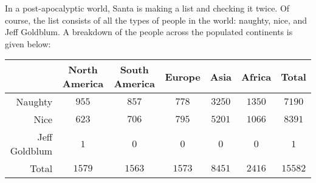 \documentclass[12pt,letterpaper]{exam}
\begin{document}
\begin{questions}
\newpage
\question In a post-apocalyptic world, Santa is making a list and checking it twice. Of course, the list consists of all the types of people in the world: naughty, nice, and Jeff Goldblum. A breakdown of the people across the populated continents is given below:
	\begin{table}[!ht]
	\centering
	\begin{tabular}{|r||c|c|c|c|c||c|} \hline
	& North America & South America & Europe & Asia & Africa & Total \\ \hline
	Naughty & $955$ & $857$ & $778$ & $3250$ & $1350$ & $7190$ \\ \hline
	Nice & $623$ & $706$ & $795$ & $5201$ & $1066$ & $8391$ \\ \hline
	Jeff Goldblum & $1$ & $0$ & $0$ & $0$ & $0$ & $1$ \\ \hline \hline
	Total & $1579$ & $1563$ & $1573$ & $8451$ & $2416$ & $15582$ \\ \hline
	\end{tabular}
	\end{table}







\end{questions}
\end{document}
